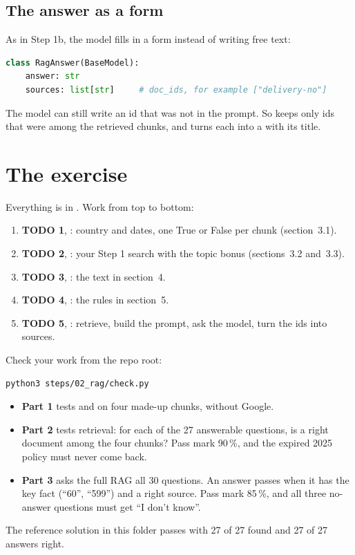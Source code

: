 \documentclass[11pt]{article}
\begin{document}
\subsection{The answer as a form}

As in Step 1b, the model fills in a form instead of writing free text:
\begin{lstlisting}[language=Python]
class RagAnswer(BaseModel):
    answer: str
    sources: list[str]     # doc_ids, for example ["delivery-no"]
\end{lstlisting}
The model can still write an id that was not in the prompt. So
 keeps only ids that were among the retrieved chunks, and
turns each into a  with its title.

\section{The exercise}

Everything is in . Work from top to bottom:

\begin{enumerate}[leftmargin=1.4em, itemsep=3pt]
\item \textbf{TODO 1}, : country and dates, one
  True or False per chunk (section~3.1).
\item \textbf{TODO 2}, : your Step 1 search with the
  topic bonus (sections~3.2 and~3.3).
\item \textbf{TODO 3}, : the text in section~4.
\item \textbf{TODO 4}, : the rules in section~5.
\item \textbf{TODO 5}, : retrieve, build the prompt, ask
  the model, turn the ids into sources.
\end{enumerate}

Check your work from the repo root:
\begin{lstlisting}
python3 steps/02_rag/check.py
\end{lstlisting}
\begin{itemize}[leftmargin=1.4em, itemsep=2pt]
\item \textbf{Part 1} tests  and
   on four made-up chunks, without Google.
\item \textbf{Part 2} tests retrieval: for each of the 27 answerable
  questions, is a right document among the four chunks? Pass mark 90\,\%,
  and the expired 2025 policy must never come back.
\item \textbf{Part 3} asks the full RAG all 30 questions. An answer
  passes when it has the key fact (``60'', ``599'') and a right source.
  Pass mark 85\,\%, and all three no-answer questions must get ``I don't
  know''.
\end{itemize}
The reference solution in this folder passes with 27 of 27 found and 27
of 27 answers right.
\end{document}
